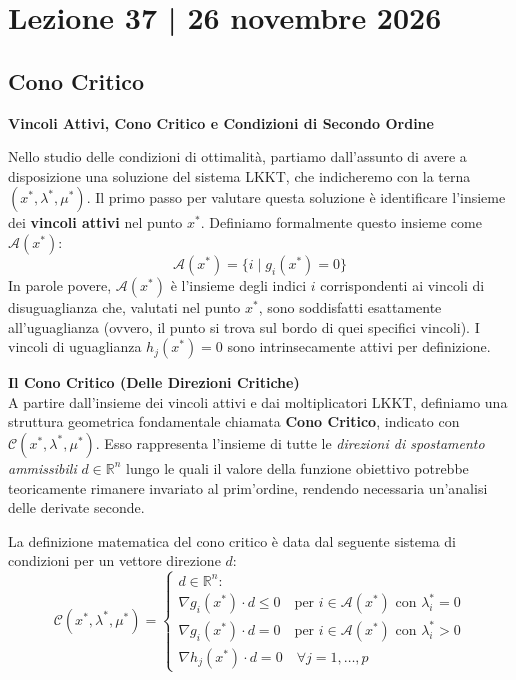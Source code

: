 \documentclass[12pt, a4paper]{article}
\begin{document}
	\section*{Lezione 37 | 26 novembre 2026}
	\subsection*{Cono Critico}
	
	\textbf{Vincoli Attivi, Cono Critico e Condizioni di Secondo Ordine}
	
	Nello studio delle condizioni di ottimalità, partiamo dall'assunto di avere a disposizione una soluzione del sistema LKKT, che indicheremo con la terna $(x^*, \lambda^*, \mu^*)$.
	Il primo passo per valutare questa soluzione è identificare l'insieme dei \textbf{vincoli attivi} nel punto $x^*$. Definiamo formalmente questo insieme come $\mathcal{A}(x^*)$:
	\[
	\mathcal{A}(x^*) = \{ i \mid g_i(x^*) = 0 \}
	\]
	In parole povere, $\mathcal{A}(x^*)$ è l'insieme degli indici $i$ corrispondenti ai vincoli di disuguaglianza che, valutati nel punto $x^*$, sono soddisfatti esattamente all'uguaglianza (ovvero, il punto si trova sul bordo di quei specifici vincoli). I vincoli di uguaglianza $h_j(x^*) = 0$ sono intrinsecamente attivi per definizione.
	
	\vspace{0.4cm}
	\textbf{Il Cono Critico (Delle Direzioni Critiche)}\\
	A partire dall'insieme dei vincoli attivi e dai moltiplicatori LKKT, definiamo una struttura geometrica fondamentale chiamata \textbf{Cono Critico}, indicato con $\mathcal{C}(x^*, \lambda^*, \mu^*)$. Esso rappresenta l'insieme di tutte le \textit{direzioni di spostamento ammissibili} $d \in \mathbb{R}^n$ lungo le quali il valore della funzione obiettivo potrebbe teoricamente rimanere invariato al prim'ordine, rendendo necessaria un'analisi delle derivate seconde.
	
	La definizione matematica del cono critico è data dal seguente sistema di condizioni per un vettore direzione $d$:
	\[
	\mathcal{C}(x^*, \lambda^*, \mu^*) = 
	\begin{cases}
		d \in \mathbb{R}^n : \\
		\nabla g_i(x^*) \cdot d \le 0 \quad \text{per } i \in \mathcal{A}(x^*) \text{ con } \lambda^*_i = 0 \\[4pt]
		\nabla g_i(x^*) \cdot d = 0 \quad \text{per } i \in \mathcal{A}(x^*) \text{ con } \lambda^*_i > 0 \\[4pt]
		\nabla h_j(x^*) \cdot d = 0 \quad \forall j=1,\dots,p
	\end{cases}
	\]
	
\end{document}
